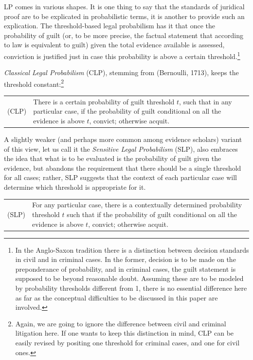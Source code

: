 \documentclass[10pt,dvipsnames,enabledeprecatedfontcommands]{scrartcl}
\begin{document}
LP comes in various shapes. It is one thing to say that the standards of
juridical proof are to be explicated in probabilistic terms, it is
another to provide such an explication. The threshold-based legal
probabilism has it that once the probability of guilt (or, to be more
precise, the factual statement that according to law is equivalent to
guilt) given the total evidence available is assessed, conviction is
justified just in case this probability is above a certain
threshold.\footnote{In the Anglo-Saxon tradition there is a distinction between decision standards in civil and in criminal cases. In the former,  decision is to be made on the preponderance of probability, and in criminal cases, the guilt statement is supposed to be beyond reasonable doubt. Assuming these are to be modeled by probability thresholds different from 1, there is no essential difference here as far as the conceptual difficulties to be discussed in this paper are involved.}

\emph{Classical Legal Probabilism} (CLP), stemming from (Bernoulli,
1713), keeps the threshold
constant:\footnote{Again, we are going to ignore the difference between civil and criminal litigation here. If one wants to keep this distinction in mind, CLP can be easily revised by positing one threshold for criminal cases, and one for civil ones. }

\begin{center}
\begin{tabular}{lp{11.5cm}}
{(CLP)} & There is a certain probability of guilt threshold $t$, such that in any particular case, if the probability of guilt conditional on all the evidence is above $t$, convict; otherwise acquit.\end{tabular}
 \end{center}

A slightly weaker (and perhaps more common among evidence scholars)
variant of this view, let us call it the
\emph{Sensitive Legal Probabilism} (SLP), also embraces the idea that
what is to be evaluated is the probability of guilt given the evidence,
but abandons the requirement that there should be a single threshold for
all cases; rather, SLP suggests that the context of each particular case
will determine which threshold is appropriate for it.

\begin{center}
\begin{tabular}{lp{11.5cm}}
{(SLP)} & For  any particular case, there is a contextually determined probability threshold $t$ such that if the probability of guilt conditional on all the evidence is above $t$, convict; otherwise acquit.\end{tabular}
 \end{center}
\end{document}
